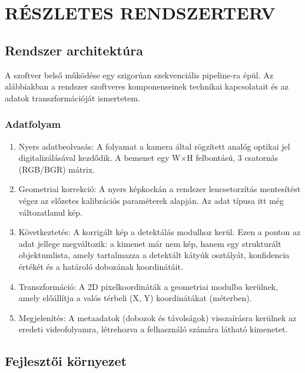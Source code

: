 \section{RÉSZLETES RENDSZERTERV}\label{ruxe9szletes-rendszerterv}

\subsection{Rendszer architektúra}\label{rendszer-architektuxfara}

A szoftver belső működése egy szigorúan szekvenciális pipeline-ra épül. Az alábbiakban a rendszer szoftveres
komponenseinek technikai kapcsolatait és az adatok transzformációját
ismertetem.

\subsubsection{Adatfolyam}\label{adatfolyam}

\begin{enumerate}
\def\labelenumi{\arabic{enumi}.}
\item
  Nyers adatbeolvasás: A folyamat a kamera által rögzített analóg
  optikai jel digitalizálásával kezdődik. A bemenet egy W×H felbontású,
  3 csatornás (RGB/BGR) mátrix.
\item
  Geometriai korrekció: A nyers képkockán a rendszer lencsetorzítás
  mentesítést végez az előzetes kalibrációs paraméterek alapján. Az adat
  típusa itt még változatlanul kép.
\item
  Következtetés: A korrigált kép a detektálás modulhoz kerül. Ezen a
  ponton az adat jellege megváltozik: a kimenet már nem kép, hanem egy
  strukturált objektumlista, amely tartalmazza a detektált kátyúk
  osztályát, konfidencia értékét és a határoló dobozának koordinátáit.
\item
  Transzformáció: A 2D pixelkoordináták a geometriai modulba kerülnek,
  amely előállítja a valós térbeli (X, Y) koordinátákat (méterben).
\item
  Megjelenítés: A metaadatok (dobozok és távolságok) visszaírásra
  kerülnek az eredeti videofolyamra, létrehozva a felhasználó számára
  látható kimenetet.
\end{enumerate}

\subsection{Fejlesztői környezet}\label{fejlesztux151i-kuxf6rnyezet}


